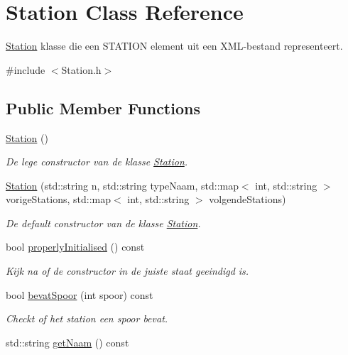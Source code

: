 \hypertarget{class_station}{}\section{Station Class Reference}
\label{class_station}


\hyperlink{class_station}{Station} klasse die een S\+T\+A\+T\+I\+ON element uit een X\+M\+L-\/bestand representeert.  




{\ttfamily \#include $<$Station.\+h$>$}

\subsection*{Public Member Functions}
\begin{DoxyCompactItemize}
\item 
\hyperlink{class_station_a73d335726aad1d844d81cda6d9fd74e6}{Station} ()
\begin{DoxyCompactList}\small\item\em De lege constructor van de klasse \hyperlink{class_station}{Station}. \end{DoxyCompactList}\item 
\hyperlink{class_station_a1e4adf32db055845769b79fe25b0e946}{Station} (std\+::string n, std\+::string type\+Naam, std\+::map$<$ int, std\+::string $>$ vorige\+Stations, std\+::map$<$ int, std\+::string $>$ volgende\+Stations)
\begin{DoxyCompactList}\small\item\em De default constructor van de klasse \hyperlink{class_station}{Station}. \end{DoxyCompactList}\item 
bool \hyperlink{class_station_a5749af84d13b71d34aa1fb5b0a935a20}{properly\+Initialised} () const 
\begin{DoxyCompactList}\small\item\em Kijk na of de constructor in de juiste staat geeindigd is. \end{DoxyCompactList}\item 
bool \hyperlink{class_station_a4851849f7f158fa51ab91a9cd56986f2}{bevat\+Spoor} (int spoor) const 
\begin{DoxyCompactList}\small\item\em Checkt of het station een spoor bevat. \end{DoxyCompactList}\item 
std\+::string \hyperlink{class_station_a6d4234bcd1027dc83c7984e207e8bd74}{get\+Naam} () const 

\end{DoxyCompactItemize}
